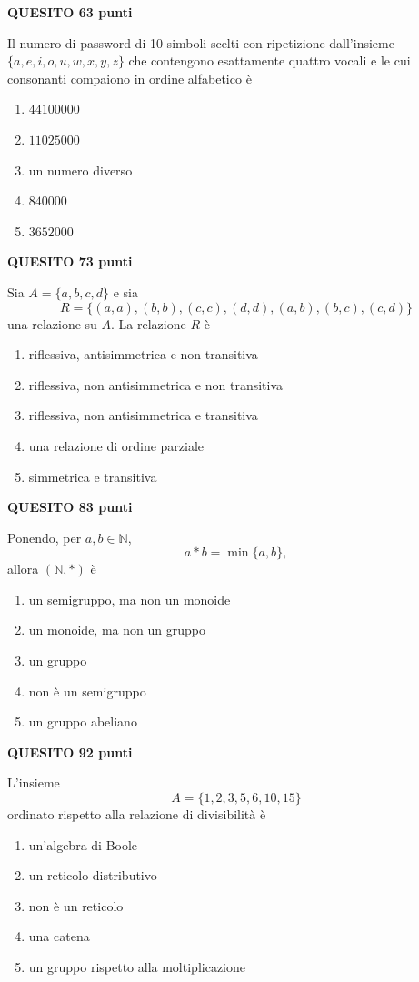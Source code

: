 \documentclass[11pt,a4paper]{article}
\newcommand{\quesito}[2]{%
    \par\addvspace{0.55em}%
    \noindent\colorbox{examPale}{%
        \parbox{\dimexpr\linewidth-2\fboxsep\relax}{%
            \color{examNavy}\textbf{QUESITO #1}\hfill\textbf{#2 punti}}}%
    \par\nobreak\vspace{0.15em}%
}
\begin{document}
\begin{samepage}
\quesito{6}{3}
Il numero di password di 10 simboli scelti con ripetizione dall'insieme
$\{a,e,i,o,u,w,x,y,z\}$ che contengono esattamente quattro vocali e le cui
consonanti compaiono in ordine alfabetico \`e
\begin{enumerate}
    \item $44100000$
    \item $11025000$
    \item un numero diverso
    \item $840000$
    \item $3652000$
\end{enumerate}
\end{samepage}

\begin{samepage}
\quesito{7}{3}
Sia $A=\{a,b,c,d\}$ e sia
\[
    R=\{(a,a),(b,b),(c,c),(d,d),(a,b),(b,c),(c,d)\}
\]
una relazione su $A$. La relazione $R$ \`e
\begin{enumerate}
    \item riflessiva, antisimmetrica e non transitiva
    \item riflessiva, non antisimmetrica e non transitiva
    \item riflessiva, non antisimmetrica e transitiva
    \item una relazione di ordine parziale
    \item simmetrica e transitiva
\end{enumerate}
\end{samepage}

\begin{samepage}
\quesito{8}{3}
Ponendo, per $a,b\in\mathbb{N}$,
\[
    a*b=\min\{a,b\},
\]
allora $(\mathbb{N},*)$ \`e
\begin{enumerate}
    \item un semigruppo, ma non un monoide
    \item un monoide, ma non un gruppo
    \item un gruppo
    \item non \`e un semigruppo
    \item un gruppo abeliano
\end{enumerate}
\end{samepage}

\begin{samepage}
\quesito{9}{2}
L'insieme
\[
    A=\{1,2,3,5,6,10,15\}
\]
ordinato rispetto alla relazione di divisibilit\`a
\`e
\begin{enumerate}
    \item un'algebra di Boole
    \item un reticolo distributivo
    \item non \`e un reticolo
    \item una catena
    \item un gruppo rispetto alla moltiplicazione
\end{enumerate}
\end{samepage}
\end{document}
